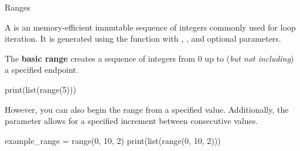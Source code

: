 \documentclass[10pt]{article}
\begin{document}
    \begin{core}{Ranges}

      A  is an memory-efficient immutable sequence of integers commonly used for loop iteration. It is generated using the  function with , , and optional  parameters.

      The \textbf{basic range} creates a sequence of integers from 0 up to (\textit{but not including}) a specified endpoint.

      \begin{pyconsole}

        print(list(range(5)))

      \end{pyconsole}

      However, you can also begin the range from a specified  value. Additionally, the  parameter allows for a specified increment between consecutive values.

      \begin{pyconsole}

        example_range = range(0, 10, 2)
        print(list(range(0, 10, 2)))

      \end{pyconsole}

    \end{core}
\end{document}
